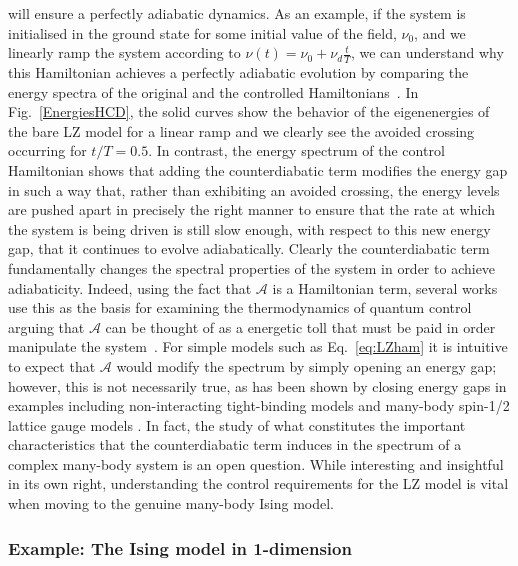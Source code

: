 will ensure a perfectly adiabatic dynamics. As an example, if the system is initialised in the ground state for some initial value of the field, $\nu_0$, and we linearly ramp the system according to $\nu(t)=\nu_0+\nu_d \tfrac{t}{T}$, we can understand why this Hamiltonian achieves a perfectly adiabatic evolution by comparing the energy spectra of the original and the controlled Hamiltonians~\cite{Abah2019}. In Fig.~\ref{EnergiesHCD}, the solid curves show the behavior of the eigenenergies of the bare LZ model for a linear ramp and we clearly see the avoided crossing occurring for $t/T=0.5$. In contrast, the energy spectrum of the control Hamiltonian shows that adding the counterdiabatic term modifies the energy gap in such a way that, rather than exhibiting an avoided crossing, the energy levels are pushed apart in precisely the right manner to ensure that the rate at which the system is being driven is still slow enough, with respect to this new energy gap, that it continues to evolve adiabatically. Clearly the counterdiabatic term fundamentally changes the spectral properties of the system in order to achieve adiabaticity. Indeed, using the fact that $\mathcal{A}$ is a Hamiltonian term, several works use this as the basis for examining the thermodynamics of quantum control arguing that $\mathcal{A}$ can be thought of as a energetic toll that must be paid in order manipulate the system~\cite{ZhengPRA2016, SantosSciRep2015, CalzettaPRA2018, FunoPRL2017, AbahEPL2017, CampbellDeffnerPRL, CampbellEPL2023}. For simple models such as Eq.~\eqref{eq:LZham} it is intuitive to expect that $\mathcal{A}$ would modify the spectrum by simply opening an energy gap; however, this is not necessarily true, as has been shown by closing energy gaps in examples including non-interacting tight-binding models \cite{duncan2024exact} and many-body spin-1/2 lattice gauge models \cite{hartmann2019rapid}. In fact, the study of what constitutes the important characteristics that the counterdiabatic term induces in the spectrum of a complex many-body system is an open question. While interesting and insightful in its own right, understanding the control requirements for the LZ model is vital when moving to the genuine many-body Ising model. 

\subsubsection{Example: The Ising model in 1-dimension}


